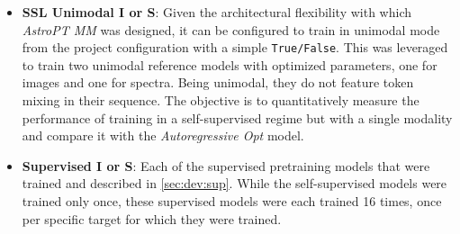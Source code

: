 \begin{itemize}
	\item \textbf{\gls{SSL} Unimodal I or S}: Given the architectural flexibility with which \textit{AstroPT MM} was designed, it can be configured to train in unimodal mode from the project configuration with a simple \texttt{True/False}. This was leveraged to train two unimodal reference models with optimized parameters, one for images and one for spectra. Being unimodal, they do not feature token mixing in their sequence. The objective is to quantitatively measure the performance of training in a self-supervised regime but with a single modality and compare it with the \textit{Autoregressive Opt} model.
	
	\item \textbf{Supervised I or S}: Each of the supervised pretraining models that were trained and described in \cref{sec:dev:sup}. While the self-supervised models were trained only once, these supervised models were each trained 16 times, once per specific target for which they were trained.
\end{itemize}


